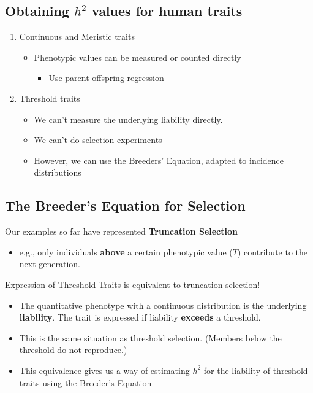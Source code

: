 \documentclass[10pt]{article}
\begin{document}
\subsection*{Obtaining $h^2$ values for human traits}
\begin{enumerate}
	\item Continuous and Meristic traits
	\begin{itemize}
	    \item Phenotypic values can be measured or counted directly
	    \begin{itemize}
	        \item Use parent-offspring regression
        \end{itemize}
    \end{itemize}
    \item Threshold traits
    \begin{itemize}
	    \item We can't measure the underlying liability directly.
	    \item We can't do selection experiments
	    \item However, we can use the Breeders' Equation, adapted to incidence distributions
    \end{itemize}
\end{enumerate}

\subsection*{The Breeder's Equation for Selection}
Our examples so far have represented \textbf{Truncation Selection}
\begin{itemize}
	\item e.g., only individuals \textbf{above} a certain phenotypic value ($T$) contribute to the next generation.
\end{itemize}
Expression of Threshold Traits is equivalent to truncation selection!
\begin{itemize}
	\item The quantitative phenotype with a continuous distribution is the underlying \textbf{liability}.  The trait is expressed if liability \textbf{exceeds} a threshold.
	\item This is the same situation as threshold selection.  (Members below the threshold do not reproduce.)
	\item This equivalence gives us a way of estimating $h^2$ for the liability of threshold traits using the Breeder's Equation
\end{itemize}
\end{document}
